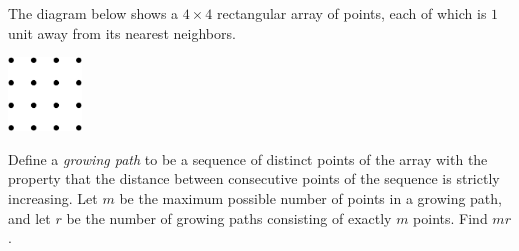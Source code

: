The diagram below shows a $ 4\times4$ rectangular array of points, each of which is $ 1$ unit away from its nearest neighbors.
\begin{center}
\includegraphics[width = 19.6mm]{img/fig0.png}
\end{center}Define a \textit{growing path} to be a sequence of distinct points of the array with the property that the distance between consecutive points of the sequence is strictly increasing. Let $ m$ be the maximum possible number of points in a growing path, and let $ r$ be the number of growing paths consisting of exactly $ m$ points. Find $ mr$.